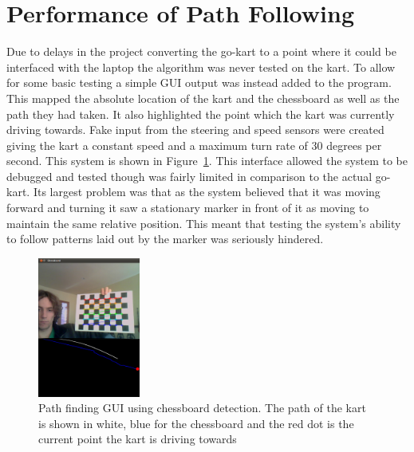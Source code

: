 \section{Performance of Path Following}

Due to delays in the project converting the go-kart to a point where it could be interfaced with the laptop the algorithm was never tested on the kart. To allow for some basic testing a simple GUI output was instead added to the program. This mapped the absolute location of the kart and the chessboard as well as the path they had taken. It also highlighted the point which the kart was currently driving towards. Fake input from the steering and speed sensors were created giving the kart a constant speed and a maximum turn rate of 30 degrees per second. This system is shown in Figure~\ref{tracking}. This interface allowed the system to be debugged and tested though was fairly limited in comparison to the actual go-kart. Its largest problem was that as the system believed that it was moving forward and turning it saw a stationary marker in front of it as moving to maintain the same relative position. This meant that testing the system's ability to follow patterns laid out by the marker was seriously hindered.

\begin{figure}[ht]
	\begin{center}
		\includegraphics[width=0.3\textwidth]{tracking}
	\end{center}
	\caption{Path finding GUI using chessboard detection. The path of the kart is shown in white, blue for the chessboard and the red dot is the current point the kart is driving towards}
	\label{tracking}
\end{figure}